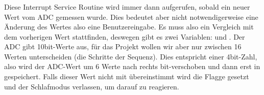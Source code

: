 \subsubsection{}
Diese Interrupt Service Routine wird immer dann aufgerufen, sobald ein neuer Wert vom ADC gemessen wurde. Dies bedeutet aber nicht notwendigerweise eine Änderung des Wertes also eine Benutzereingabe. Es muss also ein Vergleich mit dem vorherigen Wert stattfinden, deswegen gibt es zwei Variablen:  und . Der ADC gibt 10bit-Werte aus, für das Projekt wollen wir aber nur zwischen 16 Werten unterscheiden (die Schritte der Sequenz). Dies entspricht einer 4bit-Zahl, also wird der ADC-Wert um 6 Werte nach rechts bit-verschoben und dann erst in  gespeichert. Falls dieser Wert nicht mit  übereinstimmt wird die Flagge  gesetzt und der Schlafmodus verlassen, um darauf zu reagieren.

